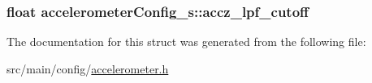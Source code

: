 \hypertarget{structaccelerometerConfig__s_a468be631025624ac2c38f5122d3be62c}{
\subsubsection[{accz\+\_\+lpf\+\_\+cutoff}]{\setlength{\rightskip}{0pt plus 5cm}float accelerometer\+Config\+\_\+s\+::accz\+\_\+lpf\+\_\+cutoff}}\label{structaccelerometerConfig__s_a468be631025624ac2c38f5122d3be62c}


The documentation for this struct was generated from the following file\+:\begin{DoxyCompactItemize}
\item 
src/main/config/\hyperlink{accelerometer_8h}{accelerometer.\+h}\end{DoxyCompactItemize}
